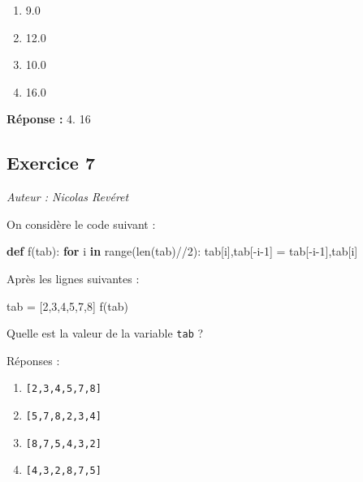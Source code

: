 \documentclass[11pt]{article}
\providecommand{\tightlist}{%
      \setlength{\itemsep}{0pt}\setlength{\parskip}{0pt}}
\newenvironment{Shaded}{}{}
\newcommand{\KeywordTok}[1]{\textcolor[rgb]{0.00,0.44,0.13}{\textbf{{#1}}}}
\newcommand{\DecValTok}[1]{\textcolor[rgb]{0.25,0.63,0.44}{{#1}}}
\newcommand{\NormalTok}[1]{{#1}}
\newcommand{\ControlFlowTok}[1]{\textcolor[rgb]{0.00,0.44,0.13}{\textbf{{#1}}}}
\newcommand{\OperatorTok}[1]{\textcolor[rgb]{0.40,0.40,0.40}{{#1}}}
\newcommand{\BuiltInTok}[1]{{#1}}
\begin{document}
\begin{enumerate}
\def\labelenumi{\arabic{enumi}.}
\tightlist
\item
  9.0
\item
  12.0
\item
  10.0
\item
  16.0
\end{enumerate}

    \textbf{Réponse :} 4. 16

    \hypertarget{exercice-7}{%
\subsection{Exercice 7}\label{exercice-7}}

\emph{Auteur : Nicolas Revéret}

On considère le code suivant :

\begin{Shaded}
\begin{Highlighting}[]
\KeywordTok{def}\NormalTok{ f(tab):}
  \ControlFlowTok{for}\NormalTok{ i }\KeywordTok{in} \BuiltInTok{range}\NormalTok{(}\BuiltInTok{len}\NormalTok{(tab)}\OperatorTok{//}\DecValTok{2}\NormalTok{):}
\NormalTok{    tab[i],tab[}\OperatorTok{{-}}\NormalTok{i}\DecValTok{{-}1}\NormalTok{] }\OperatorTok{=}\NormalTok{ tab[}\OperatorTok{{-}}\NormalTok{i}\DecValTok{{-}1}\NormalTok{],tab[i]}
\end{Highlighting}
\end{Shaded}

Après les lignes suivantes :

\begin{Shaded}
\begin{Highlighting}[]
\NormalTok{tab }\OperatorTok{=}\NormalTok{ [}\DecValTok{2}\NormalTok{,}\DecValTok{3}\NormalTok{,}\DecValTok{4}\NormalTok{,}\DecValTok{5}\NormalTok{,}\DecValTok{7}\NormalTok{,}\DecValTok{8}\NormalTok{]}
\NormalTok{f(tab)}
\end{Highlighting}
\end{Shaded}

Quelle est la valeur de la variable \texttt{tab} ?

Réponses :

\begin{enumerate}
\def\labelenumi{\arabic{enumi}.}
\tightlist
\item
  \texttt{{[}2,3,4,5,7,8{]}}
\item
  \texttt{{[}5,7,8,2,3,4{]}}
\item
  \texttt{{[}8,7,5,4,3,2{]}}
\item
  \texttt{{[}4,3,2,8,7,5{]}}
\end{enumerate}
\end{document}
